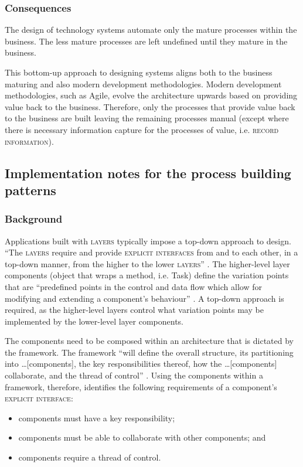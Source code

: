 \documentclass[prodmode]{style/acmlarge}
\begin{document}
\subsubsection*{Consequences} The design of technology systems automate only the
mature processes within the business.  The less mature processes are left
undefined until they mature in the business.

This bottom-up approach to designing systems aligns both to the business
maturing and also modern development methodologies.  Modern development
methodologies, such as Agile, evolve the architecture upwards based on providing
value back to the business.  Therefore, only the processes that provide value
back to the business are built leaving the remaining processes manual (except
where there is necessary information capture for the processes of value, i.e.
\textsc{record information}).



\subsection{Implementation notes for the process building patterns}

\subsubsection*{Background}

Applications built with \textsc{layers} typically impose a top-down approach to
design.  ``The \textsc{layers} require and provide \textsc{explicit interfaces}
from and to each other, in a top-down manner, from the higher to the lower
\textsc{layers}'' \cite[p. 11]{ioc}.  The higher-level layer components (object
that wraps a method, i.e. Task) define the variation points that are
``predefined points in the control and data flow which allow for modifying and
extending a component's behaviour'' \cite[p. 5]{ioc}.  A top-down approach is
required, as the higher-level layers control what variation points may be
implemented by the lower-level layer components.

The components need to be composed within an architecture that is dictated by
the framework.  The framework ``will define the overall structure, its
partitioning into \ldots [components], the key responsibilities thereof, how the
\ldots [components] collaborate, and the thread of control'' \cite[p.26]{gof}.
Using the components within a framework, therefore, identifies the following
requirements of a component's \textsc{explicit interface}:
\begin{itemize}
  \item components must have a key responsibility;
  \item components must be able to collaborate with other components; and
  \item components require a thread of control.
\end{itemize}
\end{document}
